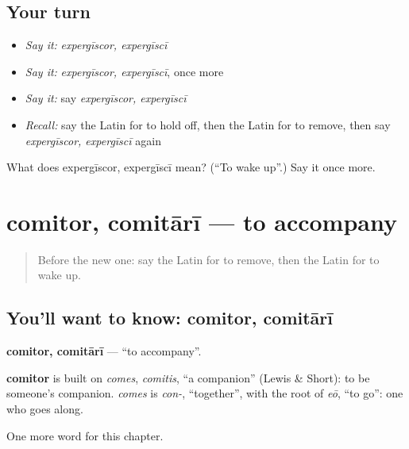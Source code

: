 \subsection*{Your turn}
\begin{itemize}
\raggedright
  \item \emph{Say it:} \emph{expergīscor, expergīscī}
  \item \emph{Say it:} \emph{expergīscor, expergīscī}, once more
  \item \emph{Say it:} say \emph{expergīscor, expergīscī}
  \item \emph{Recall:} say the Latin for to hold off, then the Latin for to remove, then say \emph{expergīscor, expergīscī} again
\end{itemize}

\begin{tcolorbox}[breakable,colback=teal!4,colframe=teal!35!black,title={Before you move on}]
What does expergīscor, expergīscī mean? (\textquotedblleft{}To wake up\textquotedblright{}.) Say it once more.
\end{tcolorbox}
\section[comitor, comitārī]{comitor, comitārī — to accompany}

\label{lesson:LA-C230-comitor}



\begin{quote}
Before the new one: say the Latin for to remove, then the Latin for to wake up.
\end{quote}

\subsection*{You'll want to know: comitor, comitārī}
\textbf{comitor, comitārī} — \textquotedblleft{}to accompany\textquotedblright{}.

\begin{cousinweb}
\textbf{comitor} is built on \emph{comes}, \emph{comitis}, \textquotedblleft{}a companion\textquotedblright{} (Lewis \& Short): to be someone's companion. \emph{comes} is \emph{con-}, \textquotedblleft{}together\textquotedblright{}, with the root of \emph{eō}, \textquotedblleft{}to go\textquotedblright{}: one who goes along.
\end{cousinweb}

\begin{grammarlens}[title={What you've built}]
One more word for this chapter.
\end{grammarlens}


